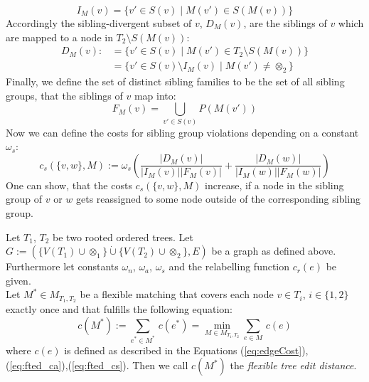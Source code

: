 \begin{equation}
I_M(v) = \{v' \in S(v)\;|\;M(v') \in S(M(v))\}
\end{equation}
Accordingly the sibling-divergent subset of $v$, $D_M(v)$, are the siblings of $v$ which are mapped to a node in $T_2 \setminus S(M(v))$:
\begin{align}
D_M(v) :&= \{v' \in S(v)\;|\;M(v') \in T_2 \setminus S(M(v))\} \\
		&= \{v' \in S(v) \setminus I_M(v)\;|\;M(v') \neq \otimes_2\}
\end{align}
Finally, we define the set of distinct sibling families to be the set of all sibling groups, that the siblings of $v$ map into:
\begin{equation}
F_M(v) = \bigcup_{v' \in S(v)} P(M(v'))
\end{equation}
Now we can define the costs for sibling group violations depending on a constant $\omega_s$:
\begin{equation}\label{eq:fted_cs}
c_s(\{v,w\},M) := \omega_s (\frac{|D_M(v)|}{|I_M(v)||F_M(v)|} + \frac{|D_M(w)|}{|I_M(w)||F_M(w)|})
\end{equation}
One can show, that the costs $c_s(\{v,w\},M)$ increase, if a node in the sibling group of $v$ or $w$ gets reassigned to some node outside of the corresponding sibling group.

\begin{defin}
Let $T_1$, $T_2$ be two rooted ordered trees. Let $G := (\{V(T_1)\cup \otimes_1\} \dot{\cup} \{V(T_2)\cup \otimes_2\}, E)$ be a graph as defined above. Furthermore let constants $\omega_n$, $\omega_a$, $\omega_s$ and the relabelling function $c_r(e)$ be given.\\
Let $M^* \in M_{T_1, T_2}$ be a flexible matching that covers each node $v \in T_i$, $i \in \{1,2\}$ exactly once and that fulfills the following equation:
$$c(M^*) := \sum_{e^* \in M^*} \, c(e^*) = \min_{M \in M_{T_1, T_2}} \sum_{e \in M} \, c(e)
$$
where $c(e)$ is defined as described in the Equations (\ref{eq:edgeCost}),(\ref{eq:fted_ca}),(\ref{eq:fted_cs}). Then we call $c(M^*)$ the \textit{flexible tree edit distance}.
\end{defin}


